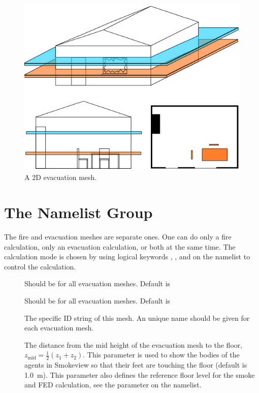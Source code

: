 \documentclass[12pt,a4paper,final,twoside]{stylevk}
\begin{document}
%
\begin{figure}[!tb]
  \centerline{\includegraphics[clip=true,
    width=120mm]{FIGURES/evac_grid2}}
  \caption{A 2D evacuation mesh.}\label{Fig_EvacGrid} 
\end{figure}
%


\section{The  Namelist Group}\label{Sec_EvacGrid}

\noindent The fire and evacuation meshes are separate ones.  One can
do only a fire calculation, only an evacuation calculation, or both at
the same time.  The calculation mode is chosen by using logical
keywords , , and
 on the  namelist to control the
calculation.

\begin{description}
%
\item[] Should be  for all evacuation
  meshes.  Default is 
%
\item[] Should be  for all
  evacuation meshes.  Default is 
%
\item[] The specific ID string of this mesh.  An unique name
  should be given for each evacuation mesh.
%
\item[] The distance from the mid height of the
  evacuation mesh to the floor, $z_\mathrm{mid} = \frac{1}{2}
  (z_1+z_2)$.  This parameter is used to show the bodies of the agents
  in Smokeview so that their feet are touching the floor (default is
  1.0~m).  This parameter also defines the reference floor level for
  the smoke and FED calculation, see the parameter
   on the  namelist.
%
\end{description}
\end{document}
